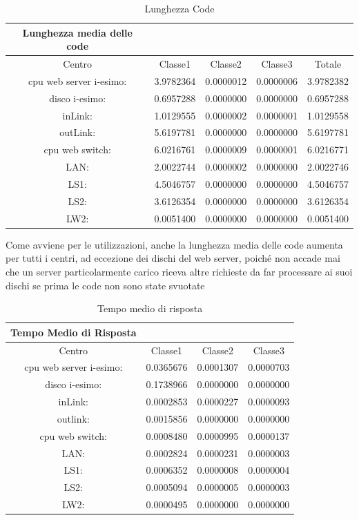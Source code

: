 \begin{table}[htbp]
\begin{center}
\begin{tabular}{|c|c|c|c|c|}
\hline
Lunghezza media delle code\\
\hline
Centro &Classe1 &Classe2 &Classe3 &Totale\\
\hline
\hline
 cpu web server i-esimo: 	&3.9782364	&0.0000012	&0.0000006	&3.9782382\\
\hline
 disco i-esimo: 	&0.6957288	&0.0000000	&0.0000000	&0.6957288\\
\hline
 inLink: 	&1.0129555	&0.0000002	&0.0000001	&1.0129558\\
\hline
 outLink: 	&5.6197781	&0.0000000	&0.0000000	&5.6197781\\
\hline
 cpu web switch: 	&6.0216761	&0.0000009	&0.0000001	&6.0216771\\
\hline
 LAN: 	&2.0022744	&0.0000002	&0.0000000	&2.0022746\\
\hline
 LS1: 	&4.5046757	&0.0000000	&0.0000000	&4.5046757\\
\hline
 LS2: 	&3.6126354	&0.0000000	&0.0000000	&3.6126354\\
\hline
 LW2: 	&0.0051400	&0.0000000	&0.0000000	&0.0051400\\
\hline
\end{tabular}
\end{center}
\caption{Lunghezza Code}
\label{lunghezzacode}
\end{table}
Come avviene per le utilizzazioni, anche la lunghezza media delle code aumenta per tutti i centri, ad eccezione dei dischi del web server, poiché non accade mai che un server particolarmente carico riceva altre richieste da far processare ai suoi dischi se prima le code non sono state svuotate
\begin{table}[htbp]
\begin{center}
\begin{tabular}{|c|c|c|c|}
\hline
Tempo Medio di Risposta\\
\hline
Centro &Classe1 &Classe2 &Classe3\\
\hline
\hline
 cpu web server i-esimo: 	&0.0365676	&0.0001307	&0.0000703\\
\hline
 disco i-esimo: 	&0.1738966	&0.0000000	&0.0000000\\
\hline
 inLink: 	&0.0002853	&0.0000227	&0.0000093\\
\hline
 outlink: 	&0.0015856	&0.0000000	&0.0000000\\
\hline
 cpu web switch: 	&0.0008480	&0.0000995	&0.0000137\\
\hline
 LAN: 	&0.0002824	&0.0000231	&0.0000003\\
\hline
 LS1: 	&0.0006352	&0.0000008	&0.0000004\\
\hline
 LS2: 	&0.0005094	&0.0000005	&0.0000003\\
\hline
 LW2: 	&0.0000495	&0.0000000	&0.0000000\\
\hline
\end{tabular}
\end{center}
\caption{Tempo medio di risposta}
\label{tempomediodirisposta}
\end{table}
